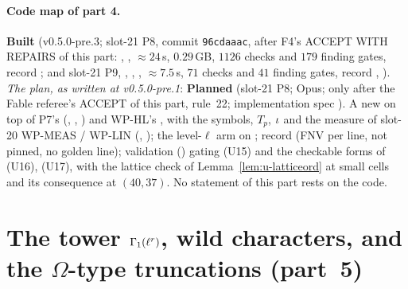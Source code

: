 \documentclass[11pt]{article}
\begin{document}
\paragraph{Code map of part 4.} \textbf{Built} (v0.5.0-pre.3; slot-21 P8, commit \texttt{96cdaaac}, after F4's ACCEPT WITH REPAIRS of this part:
, , $\approx24$\,s, $0.29$\,GB, $1126$ checks and $179$ finding gates, record ; and slot-21 P9, ,
, , $\approx7.5$\,s, $71$ checks and $41$ finding gates, record , ). \emph{The plan, as written at v0.5.0-pre.1}:
\textbf{Planned} (slot-21 P8; Opus; only after the Fable referee's ACCEPT of this part, rule~22; implementation spec
). A new  on top of P7's  (, ,
) and WP-HL's , with the symbols, $T_p$, $\iota$ and the measure of slot-20 WP-MEAS / WP-LIN (,
); the level-$\ell$ arm on ; record  (FNV per line, not pinned, no golden line); validation
 () gating (U15) and the checkable forms of (U16), (U17), with the lattice check of Lemma~\ref{lem:u-latticeord} at small cells and its consequence
at $(40,37)$. No statement of this part rests on the code.

\section{The tower \texorpdfstring{$\Gamma_1(\ell^{r})$}{Gamma1(l^r)}, wild characters, and the \texorpdfstring{$\Omega$}{Omega}-type truncations (part~5)}\label{sec:u-tower}
\end{document}
